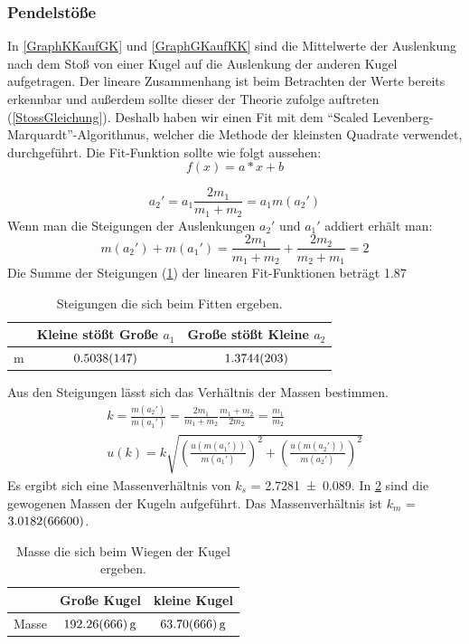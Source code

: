 \documentclass[
	a4paper,
	12pt,
	pagesize,
	ngerman
]{scrartcl}
\begin{document}
	\subsubsection{Pendelstöße}
In \cref{GraphKKaufGK} und \cref{GraphGKaufKK} sind die Mittelwerte der Auslenkung nach dem Stoß von einer Kugel auf die Auslenkung der anderen Kugel aufgetragen. Der lineare Zusammenhang ist beim Betrachten der Werte bereits erkennbar und außerdem sollte dieser der Theorie zufolge auftreten (\cref{StossGleichung}). Deshalb haben wir einen Fit mit dem \enquote{Scaled Levenberg-Marquardt}-Algorithmus, welcher die Methode der kleinsten Quadrate verwendet, durchgeführt. Die Fit-Funktion sollte wie folgt aussehen: %
	\begin{equation}
		f(x)=a*x+b
	\end{equation}
	
	\begin{equation}
		\label{StossGleichung}
		a_2' = a_1 \frac{2m_1}{m_1+m_2} = a_1 m(a_2')
	\end{equation}
	Wenn man die Steigungen der Auslenkungen $a_2'$ und $a_1'$ addiert erhält man:
	\begin{equation}
		m(a_2') + m(a_1') = \frac{2m_1}{m_1+m_2} + \frac{2m_2}{m_2+m_1} = 2
	\end{equation}
	Die Summe der Steigungen (\cref{TabelleFits}) der linearen Fit-Funktionen beträgt \SI{1,87}{}
	 
	\begin{table}[tb]
	\centering
	\begin{tabular}{ l | c | c | }
		& Kleine stößt Große $a_1$ & Große stößt Kleine $a_2$ \\ \hline 
		m &  $\SI{0,5038 \pm 0,0147}{}$ &$\SI{1,3744 \pm 0,0203}{}$  \\ \hline
	\end{tabular}
	\caption{Steigungen die sich beim Fitten ergeben.}
	\label{TabelleFits}
	\end{table}
	Aus den Steigungen lässt sich das Verhältnis der Massen bestimmen.
	\begin{align}
		k = \frac{m(a_2')}{m(a_1')} = \frac{2m_1}{m_1+m_2} \frac{m_1+m_2}{2m_2} = \frac{m_1}{m_2} \\
		u(k) =  k \sqrt{\left(\frac{u(m(a_1'))}{m(a_1')}\right)^2 + \left(\frac{u(m(a_2'))}{m(a_2')}\right)^2 }
	\end{align}
	Es ergibt sich eine Massenverhältnis von $k_s$ =  \SI{2,7281 \pm 0,089}{}. In \cref{MessungGewichte} sind die gewogenen Massen der Kugeln aufgeführt. Das Massenverhältnis ist $k_m$ = $\SI{3,0182 \pm 6,66 }{}$. 
	\begin{table}[tb]
	\centering
	\begin{tabular}{ l | c | c | }
		& Große Kugel & kleine Kugel \\ \hline 
		Masse &  $\SI{192,26 \pm 6,66}{g}$ &$\SI{63,70 \pm 6,66}{g}$  \\ \hline %
	\end{tabular}
	\caption{Masse die sich beim Wiegen der Kugel ergeben.}
	\label{MessungGewichte}
	\end{table}
	
\end{document}
